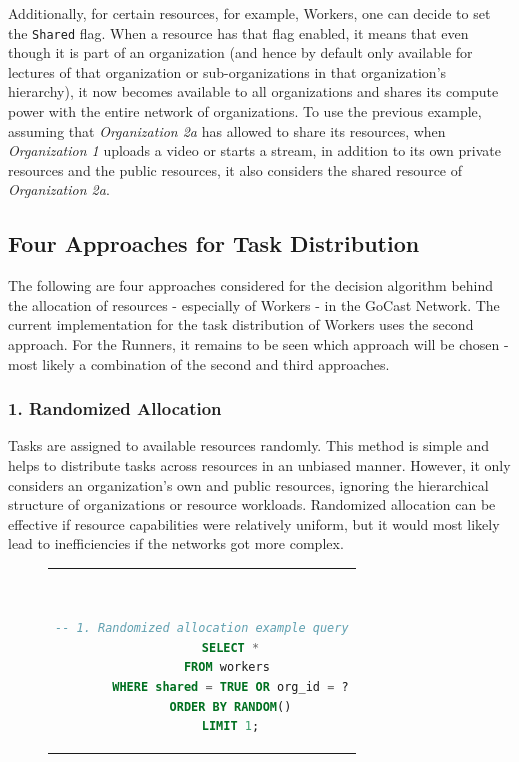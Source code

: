 Additionally, for certain resources, for example, Workers, one can decide to set the \texttt{Shared} flag. When a resource has that flag enabled, it means that even though it is part of an organization (and hence by default only available for lectures of that organization or sub-organizations in that organization's hierarchy), it now becomes available to all organizations and shares its compute power with the entire network of organizations. To use the previous example, assuming that \textit{Organization 2a} has allowed to share its resources, when \textit{Organization 1} uploads a video or starts a stream, in addition to its own private resources and the public resources, it also considers the shared resource of \textit{Organization 2a}.

\subsection{Four Approaches for Task Distribution}

The following are four approaches considered for the decision algorithm behind the allocation of resources - especially of Workers - in the GoCast Network. The current implementation for the task distribution of Workers uses the second approach. For the Runners, it remains to be seen which approach will be chosen - most likely a combination of the second and third approaches. 

\subsubsection{1. Randomized Allocation}
     Tasks are assigned to available resources randomly. This method is simple and helps to distribute tasks across resources in an unbiased manner. However, it only considers an organization's own and public resources, ignoring the hierarchical structure of organizations or resource workloads. Randomized allocation can be effective if resource capabilities were relatively uniform, but it would most likely lead to inefficiencies if the networks got more complex.

    \begin{figure}[htpb]
      \begin{tabular}{c}
      \ \small \begin{lstlisting}[language=SQL]
        -- 1. Randomized allocation example query
        SELECT *
        FROM workers 
        WHERE shared = TRUE OR org_id = ?
        ORDER BY RANDOM()
        LIMIT 1;
        \end{lstlisting}
      \end{tabular}
      \label{fig:randomized-allocation}
    \end{figure}
    
